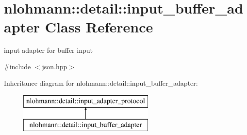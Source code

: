 \hypertarget{classnlohmann_1_1detail_1_1input__buffer__adapter}{}\section{nlohmann\+::detail\+::input\+\_\+buffer\+\_\+adapter Class Reference}
\label{classnlohmann_1_1detail_1_1input__buffer__adapter}


input adapter for buffer input  




{\ttfamily \#include $<$json.\+hpp$>$}

Inheritance diagram for nlohmann\+::detail\+::input\+\_\+buffer\+\_\+adapter\+:\begin{figure}[H]
\begin{center}
\leavevmode
\includegraphics[height=2.000000cm]{d8/dba/classnlohmann_1_1detail_1_1input__buffer__adapter}
\end{center}
\end{figure}
